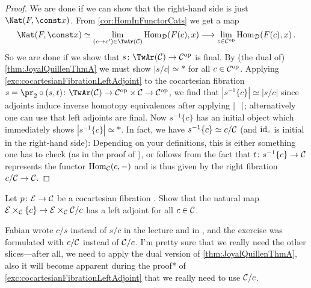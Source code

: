 \begin{proof}
	We are done if we can show that the right-hand side is just $\Nat(F,\const x)$. From \cref{cor:HomInFunctorCats} we get a map
	\begin{equation*}
		\Nat(F,\const x)\simeq \limit_{(c\rightarrow c')\in\TwAr(\Cc)}\Hom_\Dd(F(c),x)\morphism\limit_{c\in\Cc^\op}\Hom_\Dd(F(c),x)\,.
	\end{equation*}
	So we are done if we show that $s\colon\TwAr(\Cc)\morphism\Cc^\op$ is final. By (the dual of) \cref{thm:JoyalQuillenThmA} we must show $|s/c|\simeq *$ for all $c\in \mathcal{C}^{\mathrm{op}}$. Applying \cref{exc:cocartesianFibrationLeftAdjoint} to the cocartesian fibration $s={\pr_2}\circ(s,t)\colon\TwAr(\Cc)\morphism\Cc^\op\times\Cc\morphism\Cc^\op$, we find that $|s^{-1}\{c\}|\simeq|s/c|$ since adjoints induce inverse homotopy equivalences after applying $|\blank|$; alternatively one can use that left adjoints are final. Now $s^{-1}\{c\}$ has an initial object which immediately shows $|s^{-1}\{c\}|\simeq *$. In fact, we have $s^{-1}\{c\}\simeq c/\mathcal{C}$ (and $\operatorname{id}_c$ is initial in the right-hand side): Depending on your definitions, this is either something one has to check (as in the proof of \cite[Proposition~5.2.1.10]{HA}), or follows from the fact that $t\colon s^{-1}\{c\}\morphism \Cc$ represents the functor $\operatorname{Hom}_{\mathcal{C}}(c,-)$ and is thus given by the right fibration $c/\Cc\morphism \Cc$.
\end{proof}
\begin{exc}\label{exc:cocartesianFibrationLeftAdjoint}
	Let $p\colon \Ee\morphism\Cc$ be a cocartesian fibration . Show that the natural map $\Ee\times_\Cc\{c\}\morphism \Ee\times_\Cc \Cc/c$ has a left adjoint for all $c\in \mathcal{C}$.
\end{exc}
Fabian wrote $c/s$ instead of $s/c$ in the lecture and in \cite[Corollar~I.50]{KTheory}, and the exercise was formulated with $c/\mathcal{C}$ instead of $\mathcal{C}/c$. I'm pretty sure that we really need the other slices---after all, we need to apply the dual version of \cref{thm:JoyalQuillenThmA}, also it will become apparent during the proof* of \cref{exc:cocartesianFibrationLeftAdjoint} that we really need to use $\mathcal{C}/c$.
